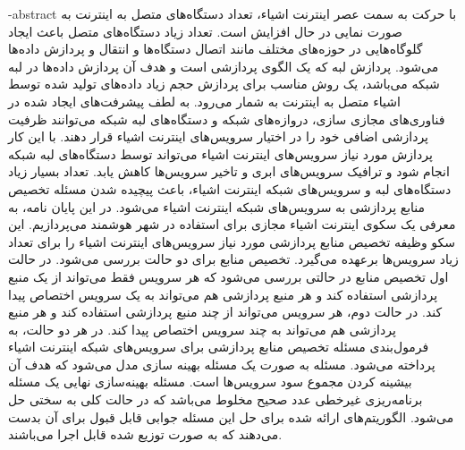 \blankpage
\fa-abstract{
  با حرکت به سمت عصر اینترنت اشیاء، تعداد دستگاه‌های متصل به اینترنت به صورت نمایی در حال افزایش است.
  تعداد زیاد دستگاه‌های متصل باعث ایجاد گلوگاه‌هایی در حوزه‌های مختلف مانند اتصال دستگاه‌ها و انتقال و پردازش داده‌ها می‌شود.
  پردازش لبه که یک الگوی پردازشی است و هدف آن پردازش داده‌ها در لبه شبکه می‌باشد، یک روش مناسب برای پردازش حجم زیاد داده‌های تولید شده توسط اشیاء متصل به اینترنت به شمار می‌رود.
  به لطف پیشرفت‌های ایجاد شده در فناوری‌های مجازی سازی، دروازه‌های شبکه و دستگاه‌های لبه شبکه می‌توانند ظرفیت پردازشی اضافی خود را در اختیار سرویس‌های اینترنت اشیاء قرار دهند.
  با این کار پردازش‌ مورد نیاز سرویس‌های اینترنت اشیاء می‌تواند توسط دستگاه‌های لبه شبکه انجام شود و ترافیک سرویس‌های ابری و تاخیر سرویس‌ها کاهش یابد.
  تعداد بسیار زیاد دستگاه‌های لبه و سرویس‌های شبکه اینترنت اشیاء، باعث پیچیده شدن مسئله تخصیص منابع پردازشی به سرویس‌های شبکه اینترنت اشیاء می‌شود.
  در این پایان نامه، به معرفی یک سکوی اینترنت اشیاء مجازی برای استفاده در شهر هوشمند می‌پردازیم.
  این سکو وظیفه تخصیص منابع پردازشی مورد نیاز سرویس‌های اینترنت اشیاء را برای تعداد زیاد سرویس‌ها برعهده می‌گیرد.
  تخصیص منابع برای دو حالت بررسی می‌شود.
  در حالت اول تخصیص منابع در حالتی بررسی می‌شود که هر سرویس فقط می‌تواند از یک منبع پردازشی استفاده کند و هر منبع پردازشی هم می‌تواند به یک سرویس اختصاص پیدا کند.
  در حالت دوم، هر سرویس می‌تواند از چند منبع پردازشی استفاده کند و هر منبع پردازشی هم می‌تواند به چند سرویس اختصاص پیدا کند.
  در هر دو حالت، به فرمول‌بندی مسئله تخصیص منابع پردازشی برای سرویس‌های شبکه اینترنت اشیاء پرداخته می‌شود.
  مسئله به صورت یک مسئله بهینه سازی مدل می‌شود که هدف آن بیشینه کردن مجموع سود سرویس‌ها است.
  مسئله بهینه‌سازی نهایی یک مسئله برنامه‌ریزی غیرخطی عدد صحیح مخلوط می‌باشد که در حالت کلی به سختی حل می‌شود.
  الگوریتم‌های ارائه شده برای حل این مسئله جوابی قابل قبول برای آن بدست می‌دهند که به صورت توزیع شده قابل اجرا می‌باشند.
}

\blankpage
\abstractPage

\newpage\clearpage
